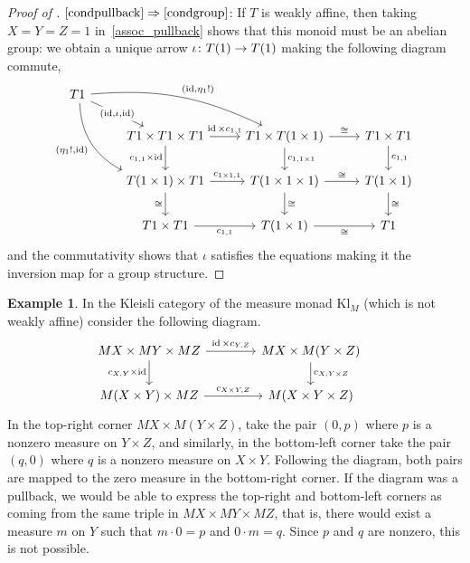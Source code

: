 \documentclass[a4paper,UKenglish,numberwithinsect,cleveref, autoref, thm-restate]{lipics-v2021}
\theoremstyle{plain} %
\theoremstyle{definition} %
\newtheorem{myexample}[mytheorem]{Example}
\begin{document}
\begin{proof}[Proof of ]
 $\ref{condpullback}\Rightarrow\ref{condgroup}$:
 If $T$ is weakly affine, then taking $X = Y = Z = 1$ in~\eqref{assoc_pullback} shows that this monoid must be an abelian group: we obtain a unique arrow $\iota \colon T(1) \to T(1)$ making the following diagram commute,
	\[
		\begin{tikzcd}
			T1 \ar{dr}[description]{(\id,\iota,\id)} \ar[bend left=15]{drr}{(\id,\eta_1 !)} \ar[bend right,swap]{ddr}{(\eta_1 !,\id)} \\
			&	T1 \times T1 \times T1 \ar{r}{\id \times c_{1,1}} \ar[swap]{d}{c_{1,1} \times \id}	& T1 \times T(1\times 1) \ar{d}{c_{1,1\times 1}} \ar{r}{\cong} & T1\times T1 \ar{d}{c_{1,1}}	\\
			&	T(1\times 1) \times T1 \ar{r}{c_{1\times 1,1}} \ar{d}[swap]{\cong}	& T(1\times 1\times 1) \ar{d}{\cong} \ar{r}{\cong} & T(1\times 1) \ar{d}{\cong} \\
			& T1\times T1 \ar{r}[swap]{c_{1,1}} & T(1\times 1) \ar{r}[swap]{\cong} & T1
		\end{tikzcd}
	\]
	and the commutativity shows that $\iota$ satisfies the equations making it the inversion map for a group structure.
\end{proof}


\begin{myexample}
 In the Kleisli category of the measure monad $\mathrm{Kl}_M$ (which is not weakly affine) consider the following diagram.
 \[
		\hspace{-9pt}	%
		\begin{tikzcd}[column sep=3.3pc]
			MX \times MY \times MZ \ar{r}{\id \times c_{Y,Z}} \ar[swap]{d}{c_{X,Y} \times \id}	& MX \times M(Y \times Z) \ar{d}{c_{X,Y \times Z}}	\\
			M(X \times Y) \times MZ \ar{r}{c_{X\times Y,Z}}						& M(X \times Y \times Z)
		\end{tikzcd}
	\]
	In the top-right corner $MX\times M(Y\times Z)$, take the pair $(0,p)$ where $p$ is a nonzero measure on $Y\times Z$, and similarly, in the bottom-left corner take the pair $(q,0)$ where $q$ is a nonzero measure on $X\times Y$. Following the diagram, both pairs are mapped to the zero measure in the bottom-right corner. If the diagram was a pullback, we would be able to express the top-right and bottom-left corners as coming from the same triple in $MX\times MY\times MZ$, that is, there would exist a measure $m$ on $Y$ such that $m\cdot 0=p$ and $0\cdot m=q$. Since $p$ and $q$ are nonzero, this is not possible.
\end{myexample}
\end{document}

